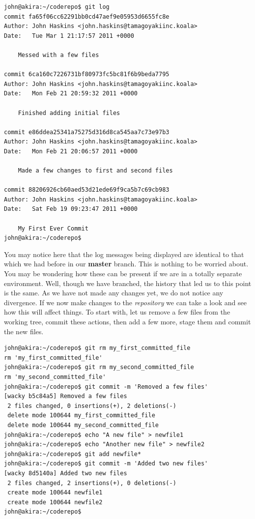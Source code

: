\begin{Verbatim}[frame=leftline,framerule=1mm,fontsize=\relsize{-3}] 
john@akira:~/coderepo$ git log
commit fa65f06cc62291bb0cd47aef9e05953d6655fc8e
Author: John Haskins <john.haskins@tamagoyakiinc.koala>
Date:   Tue Mar 1 21:17:57 2011 +0000

    Messed with a few files

commit 6ca160c7226731bf80973fc5bc81f6b9beda7795
Author: John Haskins <john.haskins@tamagoyakiinc.koala>
Date:   Mon Feb 21 20:59:32 2011 +0000

    Finished adding initial files

commit e86ddea25341a75275d316d8ca545aa7c73e97b3
Author: John Haskins <john.haskins@tamagoyakiinc.koala>
Date:   Mon Feb 21 20:06:57 2011 +0000

    Made a few changes to first and second files

commit 88206926cb60aed53d21ede69f9ca5b7c69cb983
Author: John Haskins <john.haskins@tamagoyakiinc.koala>
Date:   Sat Feb 19 09:23:47 2011 +0000

    My First Ever Commit
john@akira:~/coderepo$ 
\end{Verbatim}

You may notice here that the log messages being displayed are identical to that which we had before in our \textbf{master} branch.  This is nothing to be worried about.  You may be wondering how these can be present if we are in a totally separate environment.  Well, though we have branched, the history that led us to this point is the same.  As we have not made any changes yet, we do not notice any divergence.  If we now make changes to the \emph{repository} we can take a look and see how this will affect things.  To start with, let us remove a few files from the working tree, commit these actions, then add a few more, stage them and commit the new files.

\begin{Verbatim}[frame=leftline,framerule=1mm,fontsize=\relsize{-3}] 
john@akira:~/coderepo$ git rm my_first_committed_file
rm 'my_first_committed_file'
john@akira:~/coderepo$ git rm my_second_committed_file
rm 'my_second_committed_file'
john@akira:~/coderepo$ git commit -m 'Removed a few files'
[wacky b5c84a5] Removed a few files
 2 files changed, 0 insertions(+), 2 deletions(-)
 delete mode 100644 my_first_committed_file
 delete mode 100644 my_second_committed_file
john@akira:~/coderepo$ echo "A new file" > newfile1
john@akira:~/coderepo$ echo "Another new file" > newfile2
john@akira:~/coderepo$ git add newfile*
john@akira:~/coderepo$ git commit -m 'Added two new files'
[wacky 8d5140a] Added two new files
 2 files changed, 2 insertions(+), 0 deletions(-)
 create mode 100644 newfile1
 create mode 100644 newfile2
john@akira:~/coderepo$ 
\end{Verbatim}

